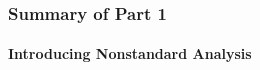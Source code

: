 \begin{frame}
\frametitle{Summary of Part 1}
\framesubtitle{Introducing Nonstandard Analysis}
\label{slide:summary-part-1}
\end{frame}
